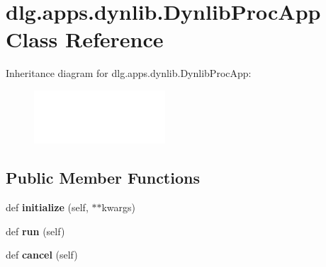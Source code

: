 \hypertarget{classdlg_1_1apps_1_1dynlib_1_1_dynlib_proc_app}{}\section{dlg.\+apps.\+dynlib.\+Dynlib\+Proc\+App Class Reference}
\label{classdlg_1_1apps_1_1dynlib_1_1_dynlib_proc_app}
Inheritance diagram for dlg.\+apps.\+dynlib.\+Dynlib\+Proc\+App\+:\begin{figure}[H]
\begin{center}
\leavevmode
\includegraphics[height=2.000000cm]{classdlg_1_1apps_1_1dynlib_1_1_dynlib_proc_app}
\end{center}
\end{figure}
\subsection*{Public Member Functions}
\begin{DoxyCompactItemize}
\item 
\mbox{\label{classdlg_1_1apps_1_1dynlib_1_1_dynlib_proc_app_aa5235ff4a5a9936da099629e1870fd3d}} 
def {\bfseries initialize} (self, $\ast$$\ast$kwargs)
\item 
\mbox{\label{classdlg_1_1apps_1_1dynlib_1_1_dynlib_proc_app_aad93714d02088ade0051ac00ffe59b56}} 
def {\bfseries run} (self)
\item 
\mbox{\label{classdlg_1_1apps_1_1dynlib_1_1_dynlib_proc_app_ad879e7a536dc704a3774170e325adc2e}} 
def {\bfseries cancel} (self)
\end{DoxyCompactItemize}
